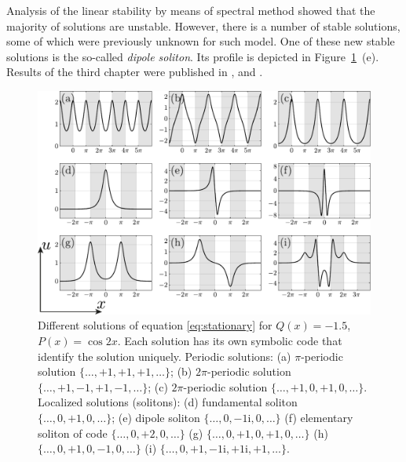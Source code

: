 \documentclass[candidate, href, colorlinks]{disser}
\begin{document}
Analysis of the linear stability by means of spectral method showed that the majority of solutions are unstable.
However, there is a number of stable solutions, some of which were previously unknown for such model.
One of these new stable solutions is the so-called {\it dipole soliton}.
Its profile is depicted in Figure~\ref{fig:solutions}~(e).
Results of the third chapter were published in \cite{LebedevAlfimovMalomed}, \cite{NizhniNovgorod2016} and \cite{Tashkent2018}.

\begin{figure}[h!]
\centering
	\includegraphics[scale = 1]{../pic/solutions for cosine equation}
	\caption{
		Different solutions of equation \eqref{eq:stationary} for $Q(x) = -1.5$, $P(x) = \cos 2x$.
		Each solution has its own symbolic code that identify the solution uniquely.
		Periodic solutions: (a) $\pi$-periodic solution $\{ \dots, +1, +1, +1, \dots \}$; (b) $2 \pi$-periodic solution $\{ \dots, +1, -1, +1, -1, \dots \}$; (c) $2 \pi$-periodic solution $\{ \dots, +1, 0, +1, 0, \dots \}$.
		Localized solutions (solitons): (d) fundamental soliton $\{ \dots, 0, +1, 0, \dots \}$; (e) dipole soliton $\{ \dots, 0, -1\mathrm{i}, 0, \dots \}$ (f) elementary soliton of code $\{ \dots, 0, +2, 0, \dots \}$ (g) $\{ \dots, 0, +1, 0, +1, 0, \dots \}$ (h) $\{ \dots, 0, +1, 0, -1, 0, \dots \}$ (i) $\{ \dots, 0, +1, -1\mathrm{i}, +1\mathrm{i}, +1, \dots \}$.
	}
\label{fig:solutions}
\end{figure}
\end{document}
